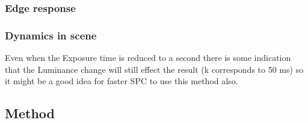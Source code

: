 \subsubsection{Edge response}

\subsubsection{Dynamics in scene}





Even when the Exposure time is reduced to a second there is some indication that the Luminance change will still effect the result (k corresponds to 50 ms) so it might be a good idea for faster SPC to use this method also.

\subsection{Method} %



